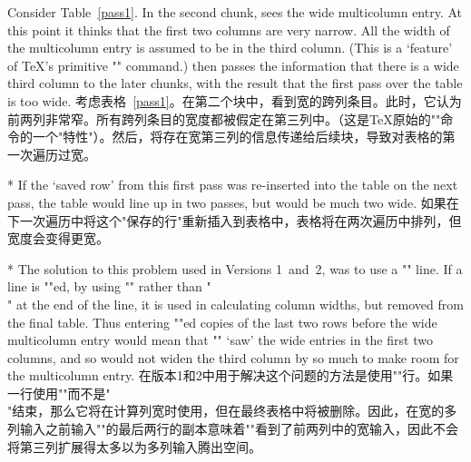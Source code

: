 \begin{paracol}{2}

Consider Table~\ref{pass1}.
In the second chunk,   sees the wide
multicolumn entry.  At this point it thinks that the first two
columns are very narrow. All
the width of the multicolumn entry is assumed to be in the
third column. (This is a `feature' of \TeX's primitive "\halign"
command.)  then passes the information that there
is a wide third column to the later chunks, with the result that the
first pass over the table is too wide.
\switchcolumn 考虑表格~\ref{pass1}。在第二个块中，看到宽的跨列条目。此时，它认为前两列非常窄。所有跨列条目的宽度都被假定在第三列中。（这是\TeX 原始的"\halign"命令的一个"特性"）。然后，将存在宽第三列的信息传递给后续块，导致对表格的第一次遍历过宽。

\switchcolumn[0]*
If the `saved row' from this first pass was re-inserted into the
table on the next pass, the table would line up in two passes, but
would be much two wide.
\switchcolumn 如果在下一次遍历中将这个"保存的行"重新插入到表格中，表格将在两次遍历中排列，但宽度会变得更宽。

\switchcolumn[0]*
\DescribeMacro{\kill}%
The solution to this problem used in Versions 1~and~2, was to use a
"\kill" line. If a line is "\kill"ed, by using "\kill" rather than
"\\" at the end of the line, it is used in calculating
column widths, but removed from the final table. Thus entering
"\kill"ed copies of the last two rows before the wide multicolumn
entry would  mean that "\halign" `saw' the wide entries in the first
two columns, and so would not widen the third column by so much to
make room for the multicolumn entry.
\switchcolumn
在版本1和2中用于解决这个问题的方法是使用"\kill"行。如果一行使用"\kill"而不是"\\"结束，那么它将在计算列宽时使用，但在最终表格中将被删除。因此，在宽的多列输入之前输入"\kill"的最后两行的副本意味着"\halign"看到了前两列中的宽输入，因此不会将第三列扩展得太多以为多列输入腾出空间。


\end{paracol}
